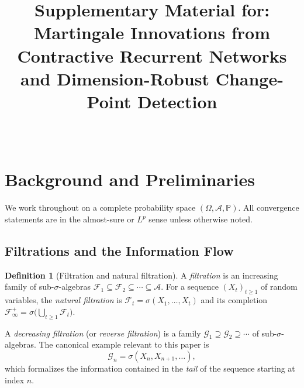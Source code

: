 \documentclass[bj,authoryear]{imsart}
\theoremstyle{plain}
\theoremstyle{definition}
\newtheorem{definition}[theorem]{Definition}
\newcommand{\Prob}{\mathbb{P}}
\newcommand{\F}{\mathcal{F}}
\newcommand{\G}{\mathcal{G}}
\newcommand{\A}{\mathcal{A}}
\begin{document}
\begin{frontmatter}
\title{Supplementary Material for:\\[0.3em]
  Martingale Innovations from Contractive Recurrent Networks
  and Dimension-Robust Change-Point Detection}
\author{~}
\end{frontmatter}

\setcounter{section}{0}
\renewcommand{\thesection}{\Alph{section}}
\renewcommand{\theequation}{\Alph{section}.\arabic{equation}}
\renewcommand{\thetable}{\Alph{section}.\arabic{table}}
\renewcommand{\thefigure}{\Alph{section}.\arabic{figure}}
\renewcommand{\thetheorem}{\Alph{section}.\arabic{theorem}}

\section{Background and Preliminaries}
\label{app:background}

We work throughout on a complete probability space $(\Omega, \A, \Prob)$.
All convergence statements are in the almost-sure or $L^p$ sense unless otherwise noted.

\subsection{Filtrations and the Information Flow}

\begin{definition}[Filtration and natural filtration]
\label{def:filtration}
  A \emph{filtration} is an increasing family of sub-$\sigma$-algebras
  $\F_1 \subseteq \F_2 \subseteq \cdots \subseteq \A$.
  For a sequence $(X_t)_{t\geq 1}$ of random variables, the
  \emph{natural filtration} is $\F_t = \sigma(X_1, \ldots, X_t)$ and its
  completion $\F_\infty^+ = \sigma\bigl(\bigcup_{t\geq 1}\F_t\bigr)$.
\end{definition}

A \emph{decreasing filtration} (or \emph{reverse filtration}) is a family
$\G_1 \supseteq \G_2 \supseteq \cdots$ of sub-$\sigma$-algebras.
The canonical example relevant to this paper is
\begin{equation}
  \G_n = \sigma(X_n, X_{n+1}, \ldots),
  \label{eq:reverse-filtration}
\end{equation}
which formalizes the information contained in the \emph{tail} of the sequence
starting at index $n$.
\end{document}
